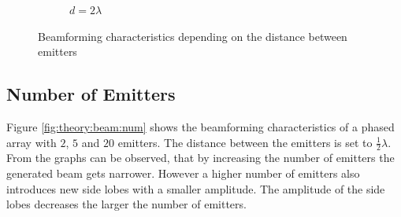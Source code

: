 \begin{figure}[ht]
\begin{subfigure}[b]{0.32\textwidth}
    \caption{$d = 2\lambda$}
    \label{fig:theory:beam:d2}
  \end{subfigure}
  \caption{Beamforming characteristics depending on the distance between emitters}
  \label{fig:theory:beam:d}
\end{figure}
%
\subsection{Number of Emitters}

Figure \ref{fig:theory:beam:num} shows the beamforming characteristics of a phased array with $2$, $5$ and $20$ emitters. The distance between the emitters is set to $\frac{1}{2} \lambda$. From the graphs can be observed, that by increasing the number of emitters the generated beam gets narrower. However a higher number of emitters also introduces new side lobes with a smaller amplitude. The amplitude of the side lobes decreases the larger the number of emitters.
%
